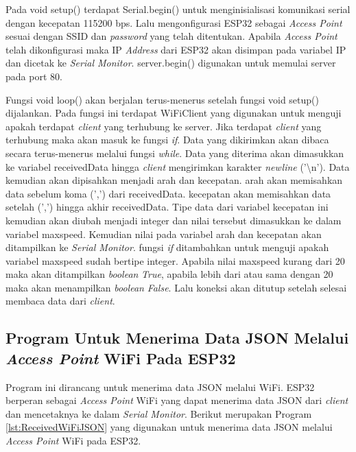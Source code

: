 Pada void setup() terdapat Serial.begin() untuk menginisialisasi komunikasi serial dengan kecepatan 115200 bps. Lalu mengonfigurasi ESP32 sebagai \emph{Access Point} sesuai dengan SSID dan \emph{password} yang telah ditentukan. Apabila \emph{Access Point} telah dikonfigurasi maka IP \emph{Address} dari ESP32 akan disimpan pada variabel IP dan dicetak ke \emph{Serial Monitor}. server.begin() digunakan untuk memulai server pada port 80.

Fungsi void loop() akan berjalan terus-menerus setelah fungsi void setup() dijalankan. Pada fungsi ini terdapat WiFiClient yang digunakan untuk menguji apakah terdapat \emph{client} yang terhubung ke server. Jika terdapat \emph{client} yang terhubung maka akan masuk ke fungsi \emph{if}. Data yang dikirimkan akan dibaca secara terus-menerus melalui fungsi \emph{while}. Data yang diterima akan dimasukkan ke variabel receivedData hingga \emph{client} mengirimkan karakter \emph{newline} ('\textbackslash n'). Data kemudian akan dipisahkan menjadi arah dan kecepatan. arah akan memisahkan data sebelum koma (',') dari receivedData. kecepatan akan memisahkan data setelah (',') hingga akhir receivedData. Tipe data dari variabel kecepatan ini kemudian akan diubah menjadi integer dan nilai tersebut dimasukkan ke dalam variabel maxspeed. Kemudian nilai pada variabel arah dan kecepatan akan ditampilkan ke \emph{Serial Monitor}. fungsi \emph{if} ditambahkan untuk menguji apakah variabel maxspeed sudah bertipe integer. Apabila nilai maxspeed kurang dari 20 maka akan ditampilkan \emph{boolean} \emph{True}, apabila lebih dari atau sama dengan 20 maka akan menampilkan \emph{boolean} \emph{False}. Lalu koneksi akan ditutup setelah selesai membaca data dari \emph{client}.

\subsection{Program Untuk Menerima Data JSON Melalui \emph{Access Point} WiFi Pada ESP32}

Program ini dirancang untuk menerima data JSON melalui WiFi. ESP32 berperan sebagai \emph{Access Point} WiFi yang dapat menerima data JSON dari \emph{client} dan mencetaknya ke dalam \emph{Serial Monitor}. Berikut merupakan Program \ref{lst:ReceivedWiFiJSON} yang digunakan untuk menerima data JSON melalui \emph{Access Point} WiFi pada ESP32.

